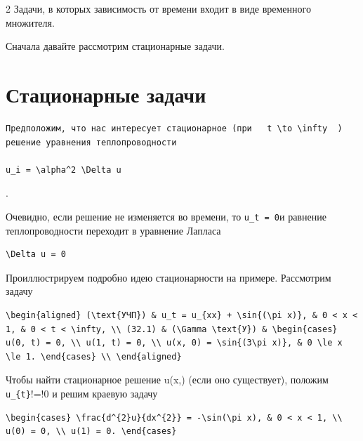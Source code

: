\documentclass[
  ukrainian,
]{article}
\begin{document}
2 Задачи, в которых зависимость от времени входит в виде временного
множителя.

Сначала давайте рассмотрим стационарные задачи.

\section{Стационарные
задачи}\label{ux441ux442ux430ux446ux438ux43eux43dux430ux440ux43dux44bux435-ux437ux430ux434ux430ux447ux438}

\begin{verbatim}
Предположим, что нас интересует стационарное (при   t \to \infty  ) решение уравнения теплопроводности

u_i = \alpha^2 \Delta u
\end{verbatim}

.

Очевидно, если решение не изменяется во времени, то \texttt{u\_t\ =\ 0}и
равнение теплопроводности переходит в уравнение Лапласа

\begin{verbatim}
\Delta u = 0
\end{verbatim}

Проиллюстрируем подробно идею стационарности на примере. Рассмотрим
задачу

\begin{verbatim}
\begin{aligned} (\text{УЧП}) & u_t = u_{xx} + \sin{(\pi x)}, & 0 < x < 1, & 0 < t < \infty, \\ (32.1) & (\Gamma \text{У}) & \begin{cases} u(0, t) = 0, \\ u(1, t) = 0, \\ u(x, 0) = \sin{(3\pi x)}, & 0 \le x \le 1. \end{cases} \\ \end{aligned}
\end{verbatim}

Чтобы найти стационарное решение u\left(x,\infty\right) (если оно
существует), положим \texttt{u\_\{t\}}!=!0 и решим краевую задачу

\begin{verbatim}
\begin{cases} \frac{d^{2}u}{dx^{2}} = -\sin(\pi x), & 0 < x < 1, \\ u(0) = 0, \\ u(1) = 0. \end{cases}
\end{verbatim}
\end{document}
